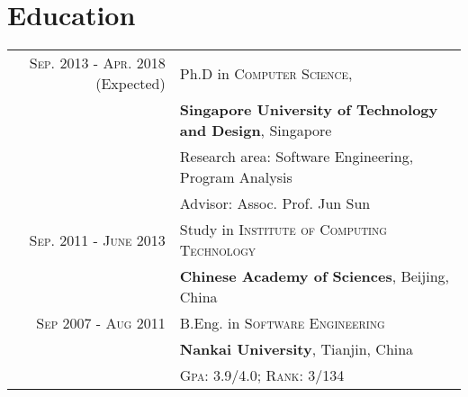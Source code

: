 \documentclass[a4paper,10pt]{article}
\begin{document}
\section{Education}
\begin{tabular}{rl}	
 \textsc{Sep.} 2013 - \textsc{Apr.} 2018 (Expected)  & Ph.D in \textsc{Computer Science}, \\
& \textbf{Singapore University of Technology and Design}, Singapore\\
& Research area: Software Engineering, Program Analysis\\
& \small Advisor: Assoc. Prof. Jun Sun\\


\textsc{Sep.} 2011 - \textsc{June} 2013& Study in \textsc{Institute of Computing Technology} \\
& \textbf{Chinese Academy of Sciences}, Beijing, China\\


\textsc{Sep} 2007 - \textsc{Aug} 2011& B.Eng. in \textsc{Software Engineering} \\
& \textbf{Nankai University}, Tianjin, China\\
&\normalsize \textsc{Gpa}: 3.9/4.0; \textsc{Rank}: 3/134 
\end{tabular}


\end{document}
